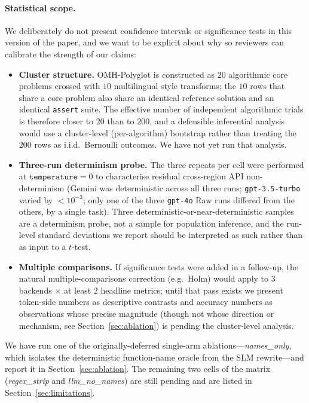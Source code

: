 \documentclass[11pt,a4paper,twocolumn]{article}
\begin{document}
\paragraph{Statistical scope.} We deliberately do not present confidence intervals or significance tests in this version of the paper, and we want to be explicit about why so reviewers can calibrate the strength of our claims:
\begin{itemize}
    \item \textbf{Cluster structure.} OMH-Polyglot is constructed as $20$ algorithmic core problems crossed with $10$ multilingual style transforms; the $10$ rows that share a core problem also share an identical reference solution and an identical \texttt{assert} suite. The effective number of independent algorithmic trials is therefore closer to $20$ than to $200$, and a defensible inferential analysis would use a cluster-level (per-algorithm) bootstrap rather than treating the $200$ rows as i.i.d.\ Bernoulli outcomes. We have not yet run that analysis.
    \item \textbf{Three-run determinism probe.} The three repeats per cell were performed at $\texttt{temperature}{=}0$ to characterise residual cross-region API non-determinism (Gemini was deterministic across all three runs; \texttt{gpt-3.5-turbo} varied by $<10^{-3}$; only one of the three \texttt{gpt-4o} Raw runs differed from the others, by a single task). Three deterministic-or-near-deterministic samples are a determinism probe, not a sample for population inference, and the run-level standard deviations we report should be interpreted as such rather than as input to a $t$-test.
    \item \textbf{Multiple comparisons.} If significance tests were added in a follow-up, the natural multiple-comparisons correction (e.g.\ Holm) would apply to $3$ backends $\times$ at least $2$ headline metrics; until that pass exists we present token-side numbers as descriptive contrasts and accuracy numbers as observations whose precise magnitude (though not whose direction or mechanism, see Section~\ref{sec:ablation}) is pending the cluster-level analysis.
\end{itemize}

We have run one of the originally-deferred single-arm ablations---\textit{names\_only}, which isolates the deterministic function-name oracle from the SLM rewrite---and report it in Section~\ref{sec:ablation}. The remaining two cells of the matrix (\textit{regex\_strip} and \textit{llm\_no\_names}) are still pending and are listed in Section~\ref{sec:limitations}.
\end{document}
